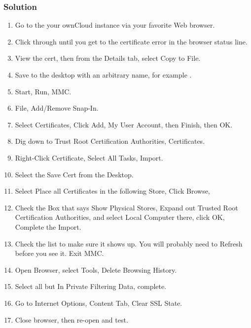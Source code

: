 \documentclass[letterpaper,10pt,english]{sphinxmanual}
\begin{document}
\subsubsection{Solution}
\label{files/access_webdav:id9}\begin{enumerate}
\item {} 
Go to the your ownCloud instance via your favorite Web browser.

\item {} 
Click through until you get to the certificate error in the browser status
line.

\item {} 
View the cert, then from the Details tab, select Copy to File.

\item {} 
Save to the desktop with an arbitrary name, for example .

\item {} 
Start, Run, MMC.

\item {} 
File, Add/Remove Snap-In.

\item {} 
Select Certificates, Click Add, My User Account, then Finish, then OK.

\item {} 
Dig down to Trust Root Certification Authorities, Certificates.

\item {} 
Right-Click Certificate, Select All Tasks, Import.

\item {} 
Select the Save Cert from the Desktop.

\item {} 
Select Place all Certificates in the following Store, Click Browse,

\item {} 
Check the Box that says Show Physical Stores, Expand out Trusted Root
Certification Authorities, and select Local Computer there, click OK,
Complete the Import.

\item {} 
Check the list to make sure it shows up. You will probably need to Refresh
before you see it. Exit MMC.

\item {} 
Open Browser, select Tools, Delete Browsing History.

\item {} 
Select all but In Private Filtering Data, complete.

\item {} 
Go to Internet Options, Content Tab, Clear SSL State.

\item {} 
Close browser, then re-open and test.

\end{enumerate}
\end{document}
